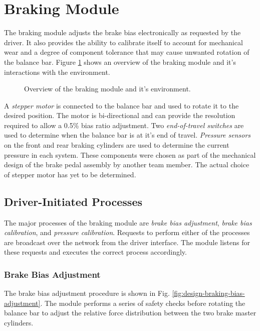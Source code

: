 \section{Braking Module\label{sec:Braking-Module-Design}}

The braking module adjusts the brake bias electronically as requested by the driver. It also provides the ability to calibrate itself to account for mechanical wear and a degree of component tolerance that may cause unwanted rotation of the balance bar. Figure \ref{fig:design_brake_overview_block} shows an overview of the braking module and it's interactions with the environment. 

\begin{figure}[H]
\centering

\caption{Overview of the braking module and it's environment.}
\label{fig:design_brake_overview_block}
\end{figure}

A \emph{stepper motor} is connected to the balance bar and used to rotate it to the desired position. The motor is bi-directional and can provide the resolution required to allow a 0.5\% bias ratio adjustment. Two \emph{end-of-travel switches} are used to determine when the balance bar is at it's end of travel. \emph{Pressure sensors} on the front and rear braking cylinders are used to determine the current pressure in each system. These components were chosen as part of the mechanical design of the brake pedal assembly by another team member. The actual choice of stepper motor has yet to be determined.

\subsection{Driver-Initiated Processes \label{sec:braking_processes}}

The major processes of the braking module are \emph{brake bias adjustment}, \emph{brake bias calibration}, and \emph{pressure calibration}. Requests to perform either of the processes are broadcast over the network from the driver interface. The module listens for these requests and executes the correct process accordingly. 

\subsubsection{Brake Bias Adjustment}

The brake bias adjustment procedure is shown in Fig. \ref{fig:design-braking-bias-adjustment}. The module performs a series of safety checks before rotating the balance bar to adjust the relative force distribution between the two brake master cylinders.

